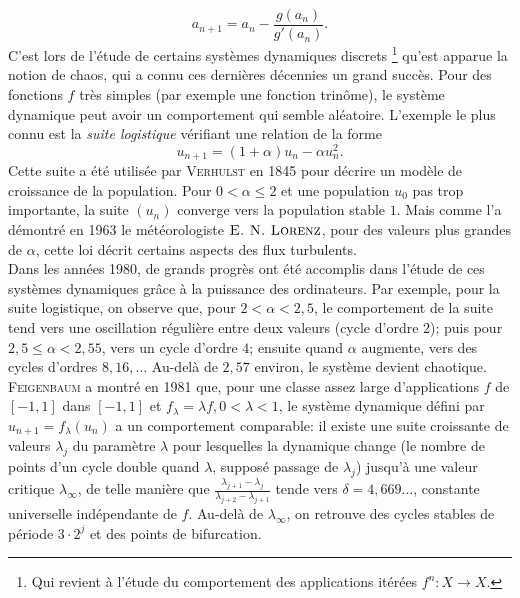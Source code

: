 {$$a_{n+1} = a_n - \frac{g(a_n)}{g'(a_n)}.$$
C'est lors de l'étude de certains systèmes dynamiques discrets \footnote{Qui revient à l'étude du comportement des applications itérées $f^n : X \to X$.} qu'est apparue la notion de chaos, qui a connu ces dernières décennies un grand succès. Pour des fonctions $f$ très simples (par exemple une fonction trinôme), le système dynamique peut avoir un comportement qui semble aléatoire. L'exemple le plus connu est la \emph{suite logistique} vérifiant une relation de la forme
$$u_{n+1} = (1 + \alpha) u_n - \alpha u_n^2.$$
Cette suite a été utilisée par \textsc{Verhulst} en 1845 pour décrire un modèle de croissance de la population. Pour $0 < \alpha \leqslant 2$ et une population $u_0$ pas trop importante, la suite $(u_n)$ converge vers la population stable $1$. Mais comme l'a démontré en 1963 le météorologiste $\textsc{E. N. Lorenz}$, pour des valeurs plus grandes de $\alpha$, cette loi décrit certains aspects des flux turbulents. \\
Dans les années 1980, de grands progrès ont été accomplis dans l'étude de ces systèmes dynamiques grâce à la puissance des ordinateurs. Par exemple, pour la suite logistique, on observe que, pour $2 < \alpha < 2,5$, le comportement de la suite tend vers une oscillation régulière entre deux valeurs (cycle d'ordre $2$); puis pour $2,5 \leqslant \alpha < 2,55$, vers un cycle d'ordre $4$; ensuite quand $\alpha$ augmente, vers des cycles d'ordres $8, 16, \dots$ Au-delà de $2,57$ environ, le système devient chaotique. \textsc{Feigenbaum} a montré en 1981 que, pour une classe assez large d'applications $f$ de $[-1, 1]$ dans $[-1, 1]$ et $f_\lambda = \lambda f, 0 < \lambda < 1$, le système dynamique défini par $u_{n+1} = f_\lambda(u_n)$ a un comportement comparable: il existe une suite croissante de valeurs $\lambda_j$ du paramètre $\lambda$ pour lesquelles la dynamique change (le nombre de points d'un cycle double quand $\lambda$, supposé passage de $\lambda_j$) jusqu'à une valeur critique $\lambda_\infty$, de telle manière que $\frac{\lambda_{j+1} - \lambda_j}{\lambda_{j+2} - \lambda_{j+1}}$ tende vers $\delta = 4,669\dots$, constante universelle indépendante de $f$. Au-delà de $\lambda_\infty$, on retrouve des cycles stables de période $3 \cdot 2^j$ et des points de bifurcation. \\
}
